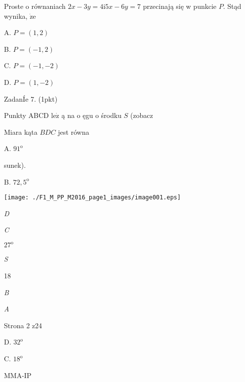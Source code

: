 \documentclass[a4paper,12pt]{article}
\begin{document}
Proste o równaniach $2x-3y=4\mathrm{i}5x-6y=7$ przecinają się w punkcie $P$. Stąd wynika, $\dot{\mathrm{z}}\mathrm{e}$

A. $P=(1,2)$

B. $P=(-1,2)$

C. $P=(-1,-2)$

D. $P=(1,-2)$

ZadanÍe 7. (1pkt)

Punkty ABCD $\mathrm{l}\mathrm{e}\dot{\mathrm{z}}$ ą na o ęgu o środku $S$ (zobacz

Miara kąta $BDC$ jest równa

A. $91^{\mathrm{o}}$

sunek).

B. $72,5^{\mathrm{o}}$
\begin{center}
\texttt{[image: ./F1\_M\_PP\_M2016\_page1\_images/image001.eps]}
\end{center}
{\it D}

{\it C}

$27^{\mathrm{o}}$

{\it S}

18

{\it B}

{\it A}

Strona 2 z24

D. $32^{\mathrm{o}}$

C. $18^{\mathrm{o}}$

MMA-IP
\end{document}

